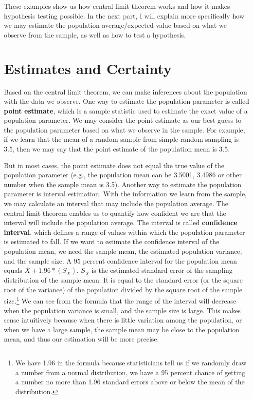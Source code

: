 \documentclass{book}
\begin{document}
These examples show us how central limit theorem works and how it makes
hypothesis testing possible. In the next part, I will explain more
specifically how we may estimate the population average/expected value based
on what we observe from the sample, as well as how to test a hypothesis.

\hypertarget{estimates-and-certainty}{%
\section{Estimates and Certainty}\label{estimates-and-certainty}}

Based on the central limit theorem, we can make inferences about the
population with the data we observe. One way to estimate the population
parameter is called \textbf{point estimate}, which is a sample statistic used
to estimate the exact value of a population parameter. We may consider the
point estimate as our best guess to the population parameter based on what we
observe in the sample. For example, if we learn that the mean of a random
sample from simple random sampling is 3.5, then we may say that the point
estimate of the population mean is 3.5.

But in most cases, the point estimate does not equal the true value of the
population parameter (e.g., the population mean can be 3.5001, 3.4986 or other
number when the sample mean is 3.5). Another way to estimate the population
parameter is interval estimation. With the information we learn from the
sample, we may calculate an interval that may include the population average.
The central limit theorem enables us to quantify how confident we are that the
interval will include the population average. The interval is called
\textbf{confidence interval}, which defines a range of values within which the
population parameter is estimated to fall. If we want to estimate the
confidence interval of the population mean, we need the sample mean, the
estimated population variance, and the sample size. A 95 percent confidence
interval for the population mean equals \(\bar{X}\pm 1.96 * (S_{\bar{X}})\).
\(S_{\bar{X}}\) is the estimated standard error of the sampling distribution
of the sample mean. It is equal to the standard error (or the square root of
the variance) of the population divided by the square root of the sample
size.\footnote{We have 1.96 in the formula because statisticians tell us if we
  randomly draw a number from a normal distribution, we have a 95 percent
  chance of getting a number no more than 1.96 standard errors above or below
  the mean of the distribution.} We can see from the formula that the range of
the interval will decrease when the population variance is small, and the
sample size is large. This makes sense intuitively because when there is
little variation among the population, or when we have a large sample, the
sample mean may be close to the population mean, and thus our estimation will
be more precise.
\end{document}
